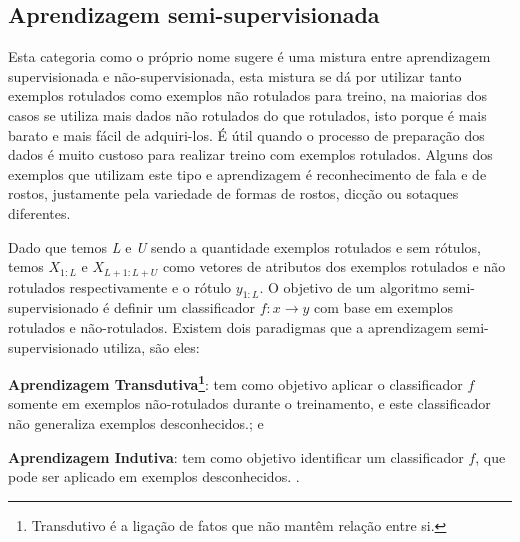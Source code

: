 \subsection{Aprendizagem semi-supervisionada}
\label{subsec:semi-supervised-learning}
Esta categoria como o próprio nome sugere é uma mistura entre aprendizagem supervisionada e não-supervisionada, 
esta mistura se dá por utilizar tanto exemplos rotulados como exemplos não rotulados para treino, na maiorias dos casos se utiliza 
mais dados não rotulados do que rotulados, isto porque é mais barato e mais fácil de adquiri-los. É útil quando o processo de preparação
dos dados é muito custoso para realizar treino com exemplos  rotulados.
Alguns dos exemplos que utilizam este tipo e aprendizagem é reconhecimento de fala e de rostos, justamente pela variedade
de formas de rostos, dicção ou sotaques diferentes.

Dado que temos \textit{L} e \textit{U} sendo a quantidade exemplos rotulados e sem rótulos, temos $X_{1:L}$ e $X_{L+1: L+U}$ como vetores de atributos dos exemplos
rotulados e não rotulados respectivamente e o rótulo $y_{1:L}$.  O objetivo de um algoritmo semi-supervisionado é definir 
um classificador $f : x \rightarrow y$ com base em exemplos rotulados e não-rotulados. Existem dois paradigmas que a aprendizagem
semi-supervisionado utiliza, são eles:

\begin{alineas}
	\item \textbf{Aprendizagem Transdutiva\footnote{Transdutivo é a ligação de fatos que não mantêm relação entre si.}}: tem como objetivo aplicar o classificador $f$ somente em exemplos 
	não-rotulados durante o treinamento, e este classificador não generaliza exemplos desconhecidos.\cite{Zhu03semi-supervisedlearning,Zhou04learningwith}; e
	\item \textbf{Aprendizagem Indutiva}: tem como objetivo identificar um classificador $f$, que pode ser aplicado em exemplos desconhecidos.
	\cite{indutive-learning}. 
\end{alineas} 